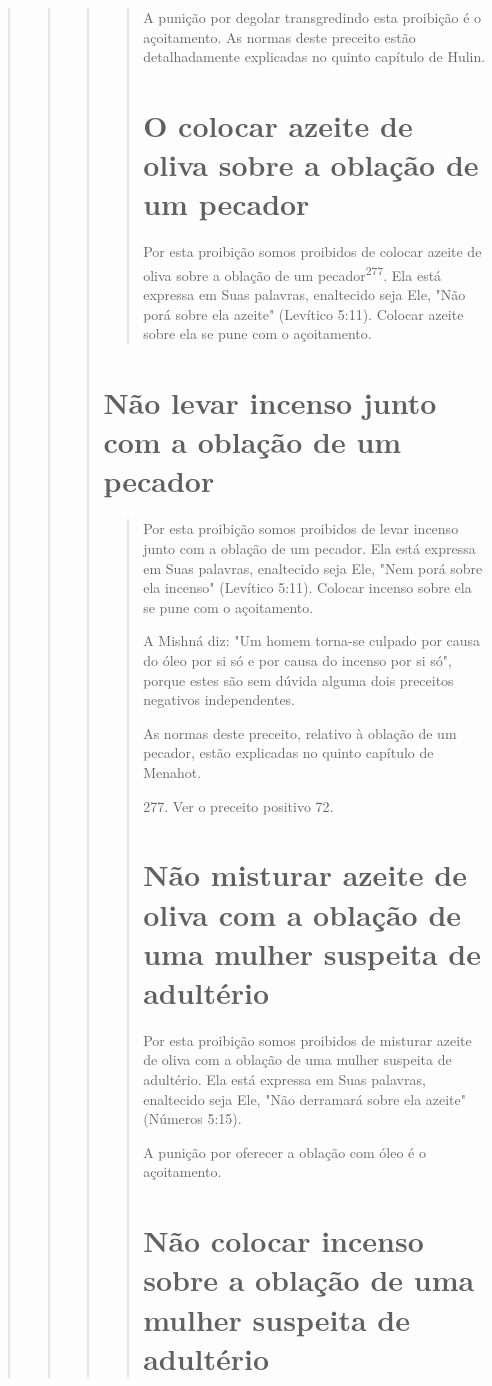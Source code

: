 \begin{quote}
\begin{quote}
\begin{quote}
\begin{quote}
A punição por degolar transgredindo esta proibição é o açoitamento. As
normas deste preceito estão detalhadamente explicadas no quin­to
capítulo de Hulin.


\section{O colocar azeite de oliva sobre a oblação de um pecador}

Por esta proibição somos proibidos de colocar azeite de oliva sobre a
oblação de um pecador\textsuperscript{277}. Ela está expressa em Suas
palavras, enaltecido se­ja Ele, "Não porá sobre ela azeite" (Levítico
5:11). Colocar azeite sobre ela se pune com o açoitamento.
\end{quote}

\section{Não levar incenso junto com a oblação de um pecador}

\begin{quote}
Por esta proibição somos proibidos de levar incenso junto com a oblação
de um pecador. Ela está expressa em Suas palavras, enaltecido seja Ele,
"Nem porá sobre ela incenso" (Levítico 5:11). Colocar incenso sobre ela
se pu­ne com o açoitamento.

A Mishná diz: "Um homem torna-se culpado por causa do óleo por si só e
por causa do incenso por si só", porque estes são sem dúvida alguma dois
preceitos negativos independentes.

As normas deste preceito, relativo à oblação de um pecador, estão
explicadas no quinto capítulo de Menahot.

277. Ver o preceito positivo 72.


\section{Não misturar azeite de oliva com a oblação de uma mulher suspeita de adultério}

Por esta proibição somos proibidos de misturar azeite de oliva com a
oblação de uma mulher suspeita de adultério. Ela está expressa em Suas
pala­vras, enaltecido seja Ele, "Não derramará sobre ela azeite"
(Números 5:15).

A punição por oferecer a oblação com óleo é o açoitamento.

\section{Não colocar incenso sobre a oblação de uma mulher suspeita de adultério}


\end{quote}
\end{quote}
\end{quote}
\end{quote}
